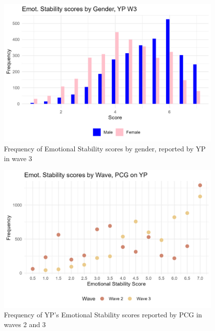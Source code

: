 \documentclass[a4paper]{article}
\begin{document}
\begin{figure}[htbp] 
    \centering
    \includegraphics[width=1\linewidth]{Frequency of Emotional Stability Gender.jpeg}
    \caption{Frequency of Emotional Stability scores by gender, reported by YP in wave 3}
    \label{}
\end{figure}

\begin{figure}[htbp] 
    \centering
    \includegraphics[width=1\linewidth]{Frequency of Emotional Stability by Wave, PCG.jpeg}
    \caption{Frequency of YP's Emotional Stability scores reported by PCG in waves 2 and 3}
    \label{}
\end{figure}
\end{document}
